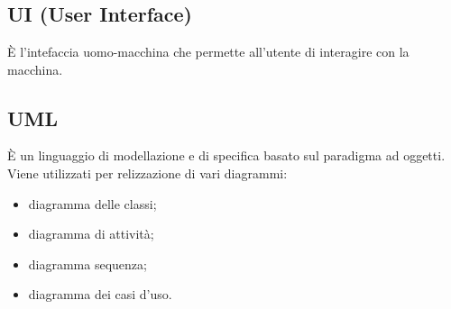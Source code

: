 \section{}
\subsection*{UI (User Interface)} È l'intefaccia uomo-macchina che permette all'utente di interagire con la macchina.

\subsection*{UML} È un linguaggio di modellazione e di specifica basato sul paradigma ad oggetti. Viene utilizzati per relizzazione di vari diagrammi:
\begin{itemize}
    \item diagramma delle classi;
    \item diagramma di attività;
    \item diagramma sequenza;
    \item diagramma dei casi d'uso.
\end{itemize}